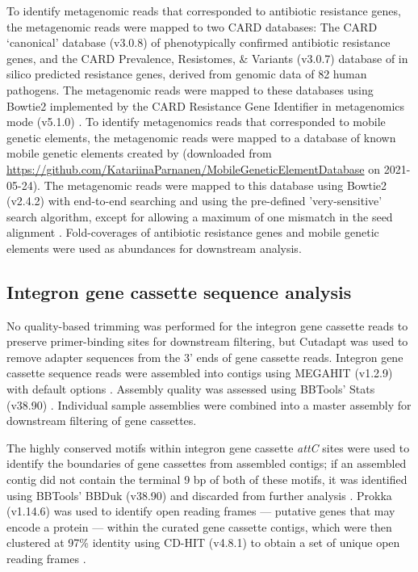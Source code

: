 To identify metagenomic reads that corresponded to antibiotic resistance genes, the metagenomic reads were mapped to two CARD databases:
The CARD ‘canonical’ database (v3.0.8) of phenotypically confirmed antibiotic resistance genes, and the CARD Prevalence, Resistomes, \& Variants (v3.0.7) database of in silico predicted resistance genes, derived from genomic data of 82 human pathogens.
The metagenomic reads were mapped to these databases using Bowtie2 implemented by the CARD Resistance Gene Identifier in metagenomics mode (v5.1.0) \parencite{Alcock.2020}.
To identify metagenomics reads that corresponded to mobile genetic elements, the metagenomic reads were mapped to a database of known mobile genetic elements created by \cite{Parnanen.2018} (downloaded from \url{https://github.com/KatariinaParnanen/MobileGeneticElementDatabase} on 2021-05-24).
The metagenomic reads were mapped to this database using Bowtie2 (v2.4.2) with end-to-end searching and using the pre-defined 'very-sensitive' search algorithm, except for allowing a maximum of one mismatch in the seed alignment \parencite{Langmead.2012}.
Fold-coverages of antibiotic resistance genes and mobile genetic elements were used as abundances for downstream analysis.

\subsection{Integron gene cassette sequence analysis} \label{section:cassette-sequence-analysis}

No quality-based trimming was performed for the integron gene cassette reads to preserve primer-binding sites for downstream filtering, but Cutadapt was used to remove adapter sequences from the 3’ ends of gene cassette reads.
Integron gene cassette sequence reads were assembled into contigs using MEGAHIT (v1.2.9) with default options \parencite{Li.2015c}.
Assembly quality was assessed using BBTools’ Stats (v38.90) \parencite{Bushnell.2016}.
Individual sample assemblies were combined into a master assembly for downstream filtering of gene cassettes.

The highly conserved motifs within integron gene cassette \textit{attC} sites were used to identify the boundaries of gene cassettes from assembled contigs; if an assembled contig did not contain the terminal 9 bp of both of these motifs, it was identified using BBTools’ BBDuk (v38.90) and discarded from further analysis \parencite{Bushnell.2016}.
Prokka (v1.14.6) was used to identify open reading frames --- putative genes that may encode a protein --- within the curated gene cassette contigs, which were then clustered at 97\% identity using CD-HIT (v4.8.1) to obtain a set of unique open reading frames \parencite{Seemann.2014, Fu.2012}.

